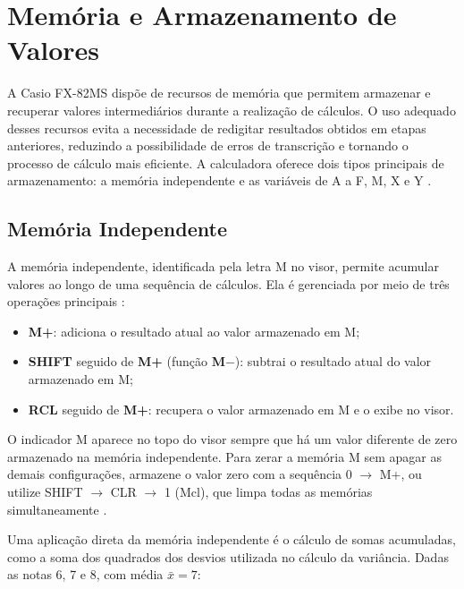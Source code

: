 \chapter{Memória e Armazenamento de Valores}

A Casio FX-82MS dispõe de recursos de memória que permitem armazenar e recuperar valores intermediários durante a realização de cálculos. O uso adequado desses recursos evita a necessidade de redigitar resultados obtidos em etapas anteriores, reduzindo a possibilidade de erros de transcrição e tornando o processo de cálculo mais eficiente. A calculadora oferece dois tipos principais de armazenamento: a memória independente e as variáveis de A a F, M, X e Y \cite{casio2004}.

\section{Memória Independente}

A memória independente, identificada pela letra M no visor, permite acumular valores ao longo de uma sequência de cálculos. Ela é gerenciada por meio de três operações principais \cite{casio2004}:

\begin{itemize}
    \item \textbf{M+}: adiciona o resultado atual ao valor armazenado em M;
    \item \textbf{SHIFT} seguido de \textbf{M+} (função \textbf{M$-$}): subtrai o resultado atual do valor armazenado em M;
    \item \textbf{RCL} seguido de \textbf{M+}: recupera o valor armazenado em M e o exibe no visor.
\end{itemize}

O indicador M aparece no topo do visor sempre que há um valor diferente de zero armazenado na memória independente. Para zerar a memória M sem apagar as demais configurações, armazene o valor zero com a sequência 0 $\to$ M+, ou utilize SHIFT $\to$ CLR $\to$ 1 (Mcl), que limpa todas as memórias simultaneamente \cite{casio2004}.

Uma aplicação direta da memória independente é o cálculo de somas acumuladas, como a soma dos quadrados dos desvios utilizada no cálculo da variância. Dadas as notas 6, 7 e 8, com média $\bar{x} = 7$:

